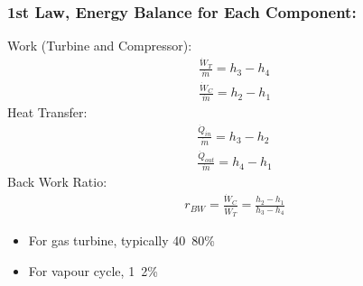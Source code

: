 \documentclass[class=report, crop=false, 12pt,a4paper]{standalone}
\numberwithin{equation}{section}
\begin{document}
\subsubsection{1st Law, Energy Balance for Each Component:}
Work (Turbine and Compressor):
\begin{gather}
  \frac{\dot{W}_{T}}{\dot{m}} = h_3-h_4 \\[5pt]
  \frac{\dot{W}_{C}}{\dot{m}} = h_2-h_1
\end{gather}
Heat Transfer: 
\begin{gather}
  \frac{\dot{Q}_{in}}{\dot{m}} = h_3-h_2 \\[5pt]
  \frac{\dot{Q}_{out}}{\dot{m}} = h_4-h_1 
\end{gather}
Back Work Ratio:
\begin{gather}
  r_{BW} = \frac{\dot{W}_C}{\dot{W}_T} = \frac{h_2-h_1}{h_3-h_4}
\end{gather}
\begin{itemize}[noitemsep]
  \item For gas turbine, typically 40~80\%
  \item For vapour cycle, 1~2\%
\end{itemize}
\end{document}
